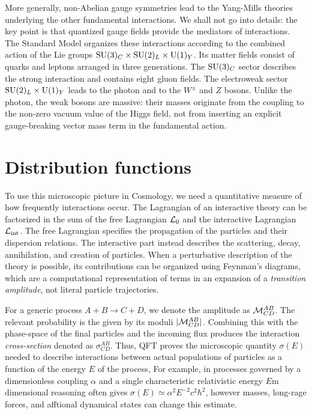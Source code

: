 More generally, non-Abelian gauge symmetries lead to the Yang-Mills theories underlying the other fundamental interactions. We shall not go into details: the key point is that quantized gauge fields provide the mediators of interactions. The Standard Model organizes these interactions according to the combined action of the Lie groups $\mathrm{SU}(3)_C \times \mathrm{SU}(2)_L \times \mathrm{U}(1)_Y$. Its matter fields consist of quarks and leptons arranged in three generations. The $\mathrm{SU}(3)_C$ sector describes the strong interaction and contains eight gluon fields. The electroweak sector $\mathrm{SU}(2)_L \times \mathrm{U}(1)_Y$ leads to the photon and to the $W^\pm$ and $Z$ bosons. Unlike the photon, the weak bosons are massive: their masses originate from the coupling to the non-zero vacuum value of the Higgs field, not from inserting an explicit gauge-breaking vector mass term in the fundamental action.

\section{Distribution functions}
To use this microscopic picture in Cosmology, we need a quantitative measure of how frequently interactions occur. The Lagrangian of an interactive theory can be factorized in the sum of the free Lagrangian $\mathcal{L}_0$ and the interactive Lagrangian $\mathcal{L}_{\mathrm{int}}$. The free Lagrangian specifies the propagation of the particles and their dispersion relations. The interactive part instead describes the scattering, decay, annihilation, and creation of particles. When a perturbative description of the theory is possible, its contributions can be organized using Feynman's diagrams, which are a computational representation of terms in an expansion of a \emph{transition amplitude}, not literal particle trajectories.

For a generic process $A + B \to C + D$, we denote the amplitude as $\mathcal{M}^{AB}_{CD}$. The relevant probability is the given by its moduli $|\mathcal{M}^{AB}_{CD}|$. Combining this with the phase-space of the final particles and the incoming flux produces the interaction \emph{cross-section} denoted as $\sigma^{AB}_{CD}$. Thus, QFT proves the microscopic quantity $\sigma(E)$ needed to describe interactions between actual populations of particles as a function of the energy $E$ of the process, For example, in processes governed by a dimensionless coupling $\alpha$ and a single characteristic relativistic energy $E$m dimensional reasoning often gives $\sigma(E) \simeq \alpha^2E^{-2}c^2\hbar^2$, however masses, long-rage forces, and afftional dynamical states can change this estimate.  

